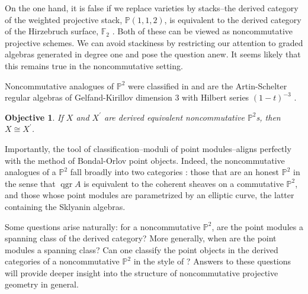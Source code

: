 \documentclass[11pt]{article}
\newtheorem{objective}{Objective}
\begin{document}
On the one hand, it is false if we replace varieties by stacks--the derived category of the weighted projective stack, $\mathbb{P}(1,1,2)$, is equivalent to the derived category of the Hirzebruch surface, $\mathbb{F}_2$ \cite{BF12}.
Both of these can be viewed as noncommutative projective schemes.
We can avoid stackiness by restricting our attention to graded algebras generated in degree one and pose the question anew.
It seems likely that this remains true in the noncommutative setting.

Noncommutative analogues of $\mathbb{P}^2$ were classified in \cite{ATV,Stephenson96,Stephenson97} and are the Artin-Schelter regular algebras \cite{AS87} of Gelfand-Kirillov dimension 3 with Hilbert series $(1-t)^{-3}$ \cite[Section 11]{SVdB01}.
\begin{tcolorbox}\begin{objective}
    If $X$ and $X^\prime$ are derived equivalent noncommutative $\mathbb{P}^2$s, then $X \cong X^\prime$.
  \end{objective}
\end{tcolorbox}

Importantly, the tool of classification--moduli of point modules--aligns perfectly with the method of Bondal-Orlov point objects.
Indeed, the noncommutative analogues of a $\mathbb{P}^2$ fall broadly into two categories \cite{Stafford02}: those that are an honest $\mathbb{P}^2$ in the sense that $\operatorname{qgr} A$ is equivalent to the coherent sheaves on a commutative $\mathbb{P}^2$, and those whose point modules are parametrized by an elliptic curve, the latter containing the Sklyanin algebras.

Some questions arise naturally: for a noncommutative $\mathbb{P}^2$, are the point modules a spanning class of the derived category?
More generally, when are the point modules a spanning class?
Can one classify the point objects in the derived categories of a noncommutative $\mathbb{P}^2$ in the style of \cite{Bondal-Orlov}?
Answers to these questions will provide deeper insight into the structure of noncommutative projective geometry in general.

\end{document}
